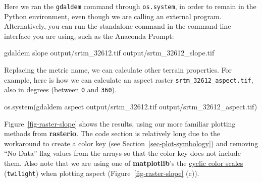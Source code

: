 \documentclass[
  letterpaper,
]{krantz}
\newenvironment{Shaded}{\begin{snugshade}}{\end{snugshade}}
\newcommand{\NormalTok}[1]{\textcolor[rgb]{0.00,0.23,0.31}{#1}}
\newcommand{\StringTok}[1]{\textcolor[rgb]{0.13,0.47,0.30}{#1}}
\begin{document}
Here we ran the \texttt{gdaldem} command through \texttt{os.system}, in
order to remain in the Python environment, even though we are calling an
external program. Alternatively, you can run the standalone command in
the command line interface you are using, such as the Anaconda Prompt:

\begin{Shaded}
\begin{Highlighting}[]
\NormalTok{gdaldem slope output/srtm\_32612.tif output/srtm\_32612\_slope.tif}
\end{Highlighting}
\end{Shaded}

Replacing the metric name, we can calculate other terrain properties.
For example, here is how we can calculate an aspect raster
\texttt{srtm\_32612\_aspect.tif}, also in degrees (between \texttt{0}
and \texttt{360}).

\begin{Shaded}
\begin{Highlighting}[]
\NormalTok{os.system(}\StringTok{\textquotesingle{}gdaldem aspect output/srtm\_32612.tif output/srtm\_32612\_aspect.tif\textquotesingle{}}\NormalTok{)}
\end{Highlighting}
\end{Shaded}

Figure~\ref{fig-raster-slope} shows the results, using our more familiar
plotting methods from \textbf{rasterio}. The code section is relatively
long due to the workaround to create a color key (see
Section~\ref{sec-plot-symbology}) and removing ``No Data'' flag values
from the arrays so that the color key does not include them. Also note
that we are using one of \textbf{matplotlib}'s the
\href{https://matplotlib.org/stable/users/explain/colors/colormaps.html\#cyclic}{cyclic
color scales} (\texttt{\textquotesingle{}twilight\textquotesingle{}})
when plotting aspect (Figure~\ref{fig-raster-slope} (c)).
\end{document}
